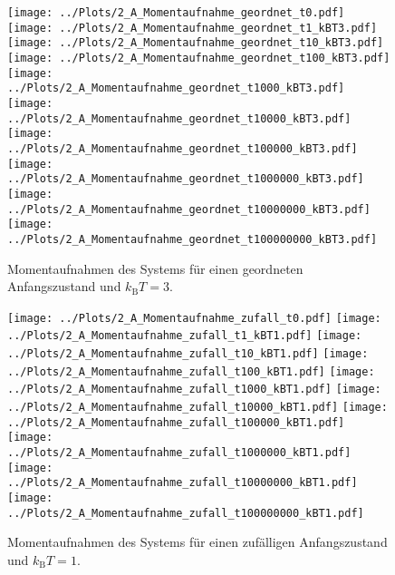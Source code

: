 \begin{figure}
\centering
\texttt{[image: ../Plots/2\_A\_Momentaufnahme\_geordnet\_t0.pdf]}
\texttt{[image: ../Plots/2\_A\_Momentaufnahme\_geordnet\_t1\_kBT3.pdf]}
\texttt{[image: ../Plots/2\_A\_Momentaufnahme\_geordnet\_t10\_kBT3.pdf]}
\texttt{[image: ../Plots/2\_A\_Momentaufnahme\_geordnet\_t100\_kBT3.pdf]}
\texttt{[image: ../Plots/2\_A\_Momentaufnahme\_geordnet\_t1000\_kBT3.pdf]}
\texttt{[image: ../Plots/2\_A\_Momentaufnahme\_geordnet\_t10000\_kBT3.pdf]}
\texttt{[image: ../Plots/2\_A\_Momentaufnahme\_geordnet\_t100000\_kBT3.pdf]}
\texttt{[image: ../Plots/2\_A\_Momentaufnahme\_geordnet\_t1000000\_kBT3.pdf]}
\texttt{[image: ../Plots/2\_A\_Momentaufnahme\_geordnet\_t10000000\_kBT3.pdf]}
\texttt{[image: ../Plots/2\_A\_Momentaufnahme\_geordnet\_t100000000\_kBT3.pdf]}
\caption{Momentaufnahmen des Systems für einen geordneten Anfangszustand und $k_\text{B}T=3$.}
\label{fig:moment_geordnet_kBT3}
\end{figure}

\begin{figure}
\centering
\texttt{[image: ../Plots/2\_A\_Momentaufnahme\_zufall\_t0.pdf]}
\texttt{[image: ../Plots/2\_A\_Momentaufnahme\_zufall\_t1\_kBT1.pdf]}
\texttt{[image: ../Plots/2\_A\_Momentaufnahme\_zufall\_t10\_kBT1.pdf]}
\texttt{[image: ../Plots/2\_A\_Momentaufnahme\_zufall\_t100\_kBT1.pdf]}
\texttt{[image: ../Plots/2\_A\_Momentaufnahme\_zufall\_t1000\_kBT1.pdf]}
\texttt{[image: ../Plots/2\_A\_Momentaufnahme\_zufall\_t10000\_kBT1.pdf]}
\texttt{[image: ../Plots/2\_A\_Momentaufnahme\_zufall\_t100000\_kBT1.pdf]}
\texttt{[image: ../Plots/2\_A\_Momentaufnahme\_zufall\_t1000000\_kBT1.pdf]}
\texttt{[image: ../Plots/2\_A\_Momentaufnahme\_zufall\_t10000000\_kBT1.pdf]}
\texttt{[image: ../Plots/2\_A\_Momentaufnahme\_zufall\_t100000000\_kBT1.pdf]}
\caption{Momentaufnahmen des Systems für einen zufälligen Anfangszustand und $k_\text{B}T=1$.}
\label{fig:moment_zufall_kBT1}
\end{figure}

